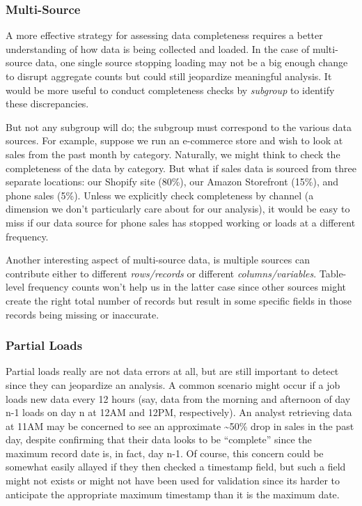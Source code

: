 \documentclass[
]{krantz}
\begin{document}
\hypertarget{multi-source}{%
\subsubsection{Multi-Source}\label{multi-source}}

A more effective strategy for assessing data completeness requires a better understanding of how data is being collected and loaded.
In the case of multi-source data, one single source stopping loading may not be a big enough change to disrupt aggregate counts but could still jeopardize meaningful analysis.
It would be more useful to conduct completeness checks by \emph{subgroup} to identify these discrepancies.

But not any subgroup will do;
the subgroup must correspond to the various data sources.
For example, suppose we run an e-commerce store and wish to look at sales from the past month by category.
Naturally, we might think to check the completeness of the data by category.
But what if sales data is sourced from three separate locations: our Shopify site (80\%), our Amazon Storefront (15\%), and phone sales (5\%).
Unless we explicitly check completeness by channel (a dimension we don't particularly care about for our analysis), it would be easy to miss if our data source for phone sales has stopped working or loads at a different frequency.

Another interesting aspect of multi-source data, is multiple sources can contribute either to different \emph{rows/records} or different \emph{columns/variables}.
Table-level frequency counts won't help us in the latter case since other sources might create the right total number of records but result in some specific fields in those records being missing or inaccurate.

\hypertarget{partial-loads}{%
\subsubsection{Partial Loads}\label{partial-loads}}

Partial loads really are not data errors at all, but are still important to detect since they can jeopardize an analysis.
A common scenario might occur if a job loads new data every 12 hours (say, data from the morning and afternoon of day n-1 loads on day n at 12AM and 12PM, respectively).
An analyst retrieving data at 11AM may be concerned to see an approximate \textasciitilde50\% drop in sales in the past day, despite confirming that their data looks to be ``complete'' since the maximum record date is, in fact, day n-1.
Of course, this concern could be somewhat easily allayed if they then checked a timestamp field, but such a field might not exists or might not have been used for validation since its harder to anticipate the appropriate maximum timestamp than it is the maximum date.
\end{document}
